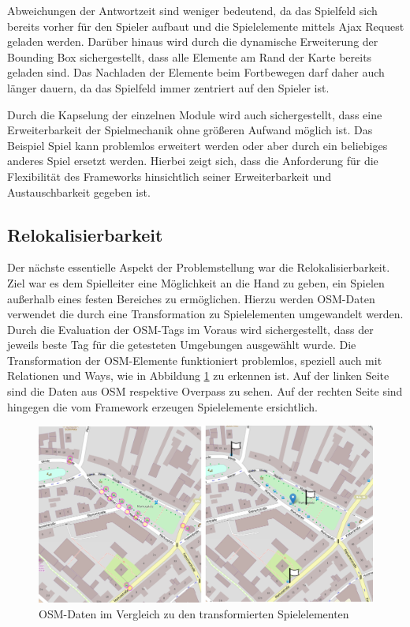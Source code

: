Abweichungen der Antwortzeit sind weniger bedeutend, da das Spielfeld sich bereits vorher für den Spieler aufbaut und die Spielelemente mittels Ajax Request geladen werden. Darüber hinaus wird durch die dynamische Erweiterung der Bounding Box sichergestellt, dass alle Elemente am Rand der Karte bereits geladen sind. Das Nachladen der Elemente beim Fortbewegen darf daher auch länger dauern, da das Spielfeld immer zentriert auf den Spieler ist.

Durch die Kapselung der einzelnen Module wird auch sichergestellt, dass eine Erweiterbarkeit der Spielmechanik ohne größeren Aufwand möglich ist. Das Beispiel Spiel kann problemlos erweitert werden oder aber durch ein beliebiges anderes Spiel ersetzt werden.
Hierbei zeigt sich, dass die Anforderung für die Flexibilität des Frameworks hinsichtlich seiner Erweiterbarkeit und Austauschbarkeit gegeben ist.

\subsection*{Relokalisierbarkeit}

Der nächste essentielle Aspekt der Problemstellung war die Relokalisierbarkeit. Ziel war es dem Spielleiter eine Möglichkeit an die Hand zu geben, ein Spielen außerhalb eines festen Bereiches zu ermöglichen. Hierzu werden OSM-Daten verwendet die durch eine Transformation zu Spielelementen umgewandelt werden. Durch die Evaluation der OSM-Tags im Voraus wird sichergestellt, dass der jeweils beste Tag für die getesteten Umgebungen ausgewählt wurde.
Die Transformation der OSM-Elemente funktioniert problemlos, speziell auch mit Relationen und Ways, wie in Abbildung \ref{img:ch6_img02_transform} zu erkennen ist. Auf der linken Seite sind die Daten aus OSM respektive Overpass zu sehen. Auf der rechten Seite sind hingegen die vom Framework erzeugen Spielelemente ersichtlich.


\begin{figure}[H]
\begin{center}
\includegraphics[width=150mm]{images/ch6_img02_transform.png}
\caption{OSM-Daten im Vergleich zu den transformierten Spielelementen}
\label{img:ch6_img02_transform}
\end{center}
\end{figure}

